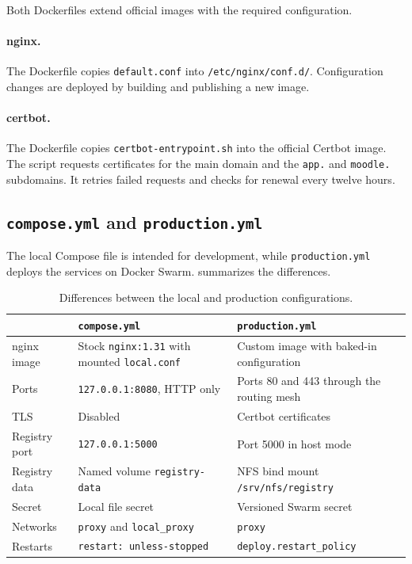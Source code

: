 Both Dockerfiles extend official images with the required configuration.

\paragraph{nginx.} The Dockerfile copies \texttt{default.conf} into
\texttt{/etc/nginx/conf.d/}. Configuration changes are deployed by
building and publishing a new image.

\paragraph{certbot.} The Dockerfile copies \texttt{certbot-entrypoint.sh}
into the official Certbot image. The script requests certificates for
the main domain and the \texttt{app.} and \texttt{moodle.} subdomains.
It retries failed requests and checks for renewal every twelve hours.

\subsection{\texttt{compose.yml} and \texttt{production.yml}}

The local Compose file is intended for development, while
\texttt{production.yml} deploys the services on Docker Swarm.
 summarizes the differences.

\begin{table}[htbp]
  \centering
  \caption{Differences between the local and production configurations.}
  \label{tab:basic-diff}
  \small
  \begin{tabular}{>{\raggedright\arraybackslash}p{27mm}>{\raggedright\arraybackslash}p{50mm}>{\raggedright\arraybackslash}p{50mm}}
    \toprule
                  & \texttt{compose.yml} & \texttt{production.yml} \\
    \midrule
    nginx image   & Stock \texttt{nginx:1.31} with mounted
                    \texttt{local.conf}
                  & Custom image with baked-in configuration \\
    Ports         & \texttt{127.0.0.1:8080}, HTTP only
                  & Ports 80 and 443 through the routing mesh \\
    TLS           & Disabled
                  & Certbot certificates \\
    Registry port & \texttt{127.0.0.1:5000}
                  & Port 5000 in host mode \\
    Registry data & Named volume \texttt{registry-data}
                  & NFS bind mount \texttt{/srv/nfs/registry} \\
    Secret        & Local file secret
                  & Versioned Swarm secret \\
    Networks      & \texttt{proxy} and \texttt{local\_proxy}
                  & \texttt{proxy} \\
    Restarts      & \texttt{restart: unless-stopped}
                  & \texttt{deploy.restart\_policy} \\
    \bottomrule
  \end{tabular}
\end{table}

